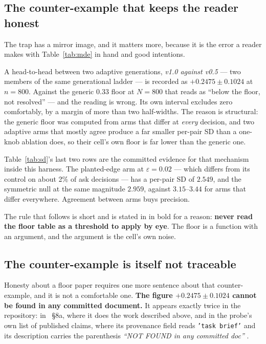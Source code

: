 \documentclass[11pt]{article}
\newcommand{\code}[1]{\texttt{#1}}
\begin{document}
\subsection{The counter-example that keeps the reader honest}
\label{sec:counter}

The trap has a mirror image, and it matters more, because it is the error a reader makes with
Table~\ref{tab:mde} in hand and good intentions.

A head-to-head between two adaptive generations, \emph{v1.0 against v0.5} --- two members of the
same generational ladder \cite{v15} --- is recorded as $+0.2475 \pm 0.1024$ at $n=800$. Against the generic $0.33$ floor at $N=800$ that reads as ``below
the floor, not resolved'' --- and the reading is wrong. Its own interval excludes zero comfortably,
by a margin of more than two half-widths. The reason is structural: the generic floor was computed
from arms that differ at \emph{every} decision, and two adaptive arms that mostly agree produce a far
smaller per-pair SD than a one-knob ablation does, so their cell's own floor is far lower than the
generic one.

Table~\ref{tab:sd}'s last two rows are the committed evidence for that mechanism inside this
harness. The planted-edge arm at $\varepsilon = 0.02$ --- which differs from its control on about
2\% of ask decisions --- has a per-pair SD of $2.549$, and the symmetric null at the same magnitude
$2.959$, against $3.15$--$3.44$ for arms that differ everywhere. Agreement between arms buys
precision.

The rule that follows is short and is stated in \cite{concession} in bold for a reason:
\textbf{never read the floor table as a threshold to apply by eye}. The floor is a function with an
argument, and the argument is the cell's own noise.

\subsection{The counter-example is itself not traceable}
\label{sec:untraceable}

Honesty about a floor paper requires one more sentence about that counter-example, and it is not a
comfortable one. \textbf{The figure $+0.2475 \pm 0.1024$ cannot be found in any committed document.}
It appears exactly twice in the repository: in \cite{concession}~\S8a, where it does the work
described above, and in the probe's own list of published claims, where its provenance field reads
\code{'task brief'} and its description carries the parenthesis \emph{``NOT FOUND in any committed
doc''} \cite{probefloor}.
\end{document}
